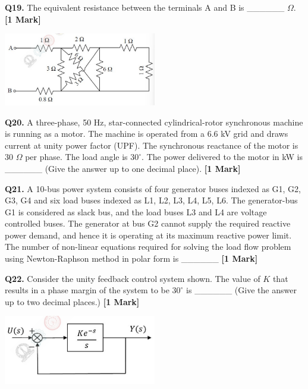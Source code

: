 \documentclass[11pt]{article}
\newcommand{\questiona}[2]{
    \noindent\textbf{Q#2.} #1 \hfill \textbf{[1 Mark]}
}
\begin{document}
\questiona{The equivalent resistance between the terminals A and B is \_\_\_\_\_\_ \( \Omega \).}{19}
\begin{center}
\includegraphics[width=0.5\textwidth]{figures/19.png}
\end{center}
\vspace{0.5cm}

\questiona{A three-phase, 50 Hz, star-connected cylindrical-rotor synchronous machine is running as a motor. The machine is operated from a 6.6 kV grid and draws current at unity power factor (UPF). The synchronous reactance of the motor is 30 \( \Omega \) per phase. The load angle is \( 30^\circ \). The power delivered to the motor in kW is \_\_\_\_\_\_ (Give the answer up to one decimal place).}{20}
\vspace{0.5cm}

\questiona{A 10-bus power system consists of four generator buses indexed as G1, G2, G3, G4 and six load buses indexed as L1, L2, L3, L4, L5, L6. The generator-bus G1 is considered as slack bus, and the load buses L3 and L4 are voltage controlled buses. The generator at bus G2 cannot supply the required reactive power demand, and hence it is operating at its maximum reactive power limit. The number of non-linear equations required for solving the load flow problem using Newton-Raphson method in polar form is \_\_\_\_\_\_}{21}
\vspace{0.5cm}

\questiona{Consider the unity feedback control system shown. The value of \( K \) that results in a phase margin of the system to be \( 30^\circ \) is \_\_\_\_\_\_ (Give the answer up to two decimal places.)}{22}
\begin{center}
\includegraphics[width=0.5\textwidth]{figures/22.png}
\end{center}
\vspace{0.5cm}
\end{document}
